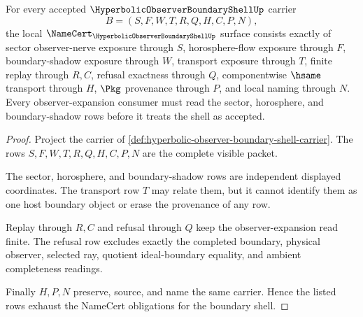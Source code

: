 \begin{theorem}
\label{thm:hyperbolic-observer-boundary-shell-namecert-obligations}
For every accepted $\HyperbolicObserverBoundaryShellUp$ carrier
$$
B=(S,F,W,T,R,Q,H,C,P,N),
$$
the local $\NameCert_{\HyperbolicObserverBoundaryShellUp}$ surface consists exactly of sector observer-nerve exposure through $S$, horosphere-flow exposure through $F$, boundary-shadow exposure through $W$, transport exposure through $T$, finite replay through $R,C$, refusal exactness through $Q$, componentwise $\hsame$ transport through $H$, $\Pkg$ provenance through $P$, and local naming through $N$. Every observer-expansion consumer must read the sector, horosphere, and boundary-shadow rows before it treats the shell as accepted.
\end{theorem}
\begin{proof}
Project the carrier of \autoref{def:hyperbolic-observer-boundary-shell-carrier}. The rows $S,F,W,T,R,Q,H,C,P,N$ are the complete visible packet.

The sector, horosphere, and boundary-shadow rows are independent displayed coordinates. The transport row $T$ may relate them, but it cannot identify them as one host boundary object or erase the provenance of any row.

Replay through $R,C$ and refusal through $Q$ keep the observer-expansion read finite. The refusal row excludes exactly the completed boundary, physical observer, selected ray, quotient ideal-boundary equality, and ambient completeness readings.

Finally $H,P,N$ preserve, source, and name the same carrier. Hence the listed rows exhaust the NameCert obligations for the boundary shell.
\end{proof}

